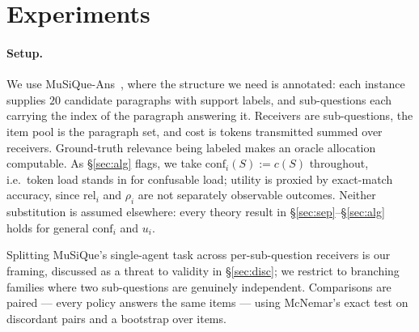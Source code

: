 \documentclass[sigconf,anonymous]{aamas}
\theoremstyle{remark}
\begin{document}
\section{Experiments}
\label{sec:exp}

\paragraph{Setup.} We use MuSiQue-Ans~\cite{musique2022}, where the
structure we need is annotated: each instance supplies $20$ candidate
paragraphs with support labels, and sub-questions each carrying the
index of the paragraph answering it. Receivers are sub-questions,
the item pool is the paragraph set, and cost is tokens transmitted
summed over receivers. Ground-truth relevance being labeled makes an
oracle allocation computable. As \S\ref{sec:alg} flags, we take
$\mathrm{conf}_i(S):=c(S)$ throughout, i.e.\ token load stands in for
confusable load; utility is proxied by exact-match accuracy, since
$\mathrm{rel}_i$ and $\rho_i$ are not separately observable outcomes.
Neither substitution is assumed elsewhere: every theory result in
\S\ref{sec:sep}--\S\ref{sec:alg} holds for general $\mathrm{conf}_i$
and $u_i$.

Splitting MuSiQue's single-agent task across per-sub-question
receivers is our framing, discussed as a threat to validity in
\S\ref{sec:disc}; we restrict to branching families where two
sub-questions are genuinely independent. Comparisons are paired ---
every policy answers the same items --- using McNemar's exact test on
discordant pairs and a bootstrap over items.
\end{document}
